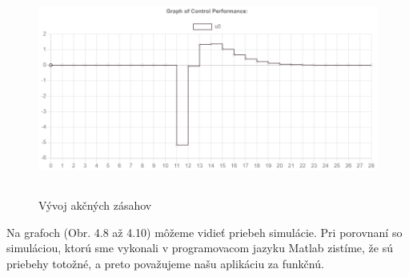\begin{figure}[H]
	\centering
	\includegraphics[width=13cm,height=7cm]{images/Hmotny_bod_apk/u}
	\caption{Vývoj akčných zásahov}
\end{figure}
Na grafoch (Obr. 4.8 až 4.10) môžeme vidieť priebeh simulácie. Pri porovnaní so simuláciou, ktorú sme vykonali v programovacom jazyku Matlab zistíme, že sú priebehy totožné, a preto považujeme našu aplikáciu za funkčnú. 